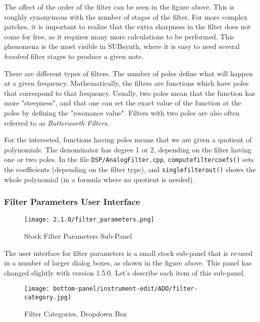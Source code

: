    The affect of the order of the filter can be seen in the figure above.
   This is roughly synonymous with the number of stages of the filter. For
   more complex patches, it is important to realize that the extra sharpness
   in the filter does not come for free, as it requires many more
   calculations to be performed. This phenomena is the most visible in
   SUBsynth, where it is easy to need several \textsl{hundred} filter stages
   to produce a given note.

   There are different types of filters. The number of poles define what will
   happen at a given frequency. Mathematically, the filters are functions which
   have poles that correspond to that frequency. Usually, two poles mean that
   the function has more "steepness", and that one can set the exact value of
   the function at the poles by defining the "resonance value". Filters with
   two poles are also often referred to as \textsl{Butterworth Filters}.

   For the interested, functions having poles means that we are given a
   quotient of polynomials. The denominator has degree 1 or 2, depending on the
   filter having one or two poles. In the file \texttt{DSP/AnalogFilter.cpp},
   \texttt{computefiltercoefs()} sets the coefficients
   (depending on the filter type), and
   \texttt{singlefilterout()} shows
   the whole polynomial (in a formula where no quotient is needed).

\subsubsection{Filter Parameters User Interface}
\label{subsubsec:filter_parameters_user_interface}

\begin{figure}[H]
   \centering
   \texttt{[image: 2.1.0/filter\_parameters.png]}
   \caption[Filter Parameters Sub-panel]{Stock Filter Parameters Sub-Panel}
   \label{fig:filter_parameters_subpanel}
\end{figure}

   The user interface for filter parameters is a small stock sub-panel that
   is re-used in a number of larger dialog boxes, as shown in the figure
   above.  This panel has changed slightly with version 1.5.0.
   Let's describe each item of this sub-panel.


\begin{figure}[H]
   \centering
   \texttt{[image: bottom-panel/instrument-edit/ADD/filter-category.jpg]}
   \caption[Filter Categories Dropdown]{Filter Categories, Dropdown Box}
   \label{fig:filter_categories_dropdown}
\end{figure}

